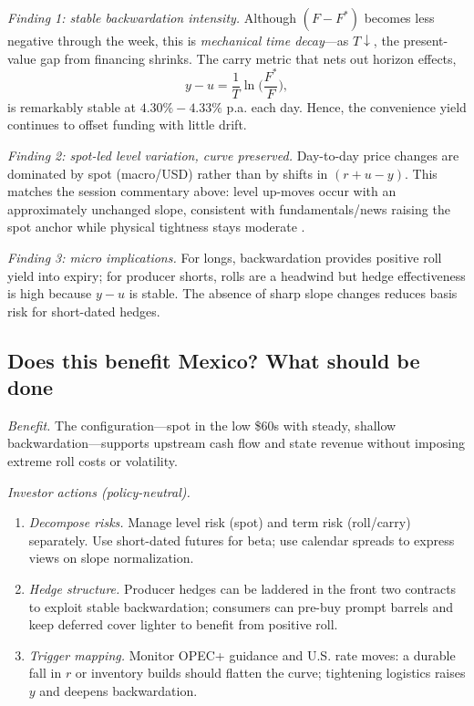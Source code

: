 \documentclass[11pt,a4paper]{article} %
\begin{document}
\textit{Finding 1: stable backwardation intensity.} Although \((F-F^{*})\) becomes less negative through the week, this is \emph{mechanical time decay}—as \(T\downarrow\), the present-value gap from financing shrinks. The carry metric that nets out horizon effects,
\[
y-u=\frac{1}{T}\ln\!\Big(\frac{F^{*}}{F}\Big),
\]
is remarkably stable at \({4.30\%{-}4.33\%}\) p.a. each day. Hence, the convenience yield continues to offset funding with little drift.

\textit{Finding 2: spot-led level variation, curve preserved.} Day-to-day price changes are dominated by spot (macro/USD) rather than by shifts in \((r+u-y)\). This matches the session commentary above: level up-moves occur with an approximately unchanged slope, consistent with fundamentals/news raising the spot anchor while physical tightness stays moderate \citep{eia_prices_2023,eia_opec_2024,bis_usd_commodity_2023}.

\textit{Finding 3: micro implications.} For longs, backwardation provides positive roll yield into expiry; for producer shorts, rolls are a headwind but hedge effectiveness is high because \(y-u\) is stable. The absence of sharp slope changes reduces basis risk for short-dated hedges.

\subsection{Does this benefit Mexico? What should be done}
\textit{Benefit.} The configuration—spot in the low \$60s with steady, shallow backwardation—supports upstream cash flow and state revenue without imposing extreme roll costs or volatility.

\textit{Investor actions (policy-neutral).}
\begin{enumerate}
  \item \emph{Decompose risks.} Manage level risk (spot) and term risk (roll/carry) separately. Use short-dated futures for beta; use calendar spreads to express views on slope normalization.
  \item \emph{Hedge structure.} Producer hedges can be laddered in the front two contracts to exploit stable backwardation; consumers can pre-buy prompt barrels and keep deferred cover lighter to benefit from positive roll.
  \item \emph{Trigger mapping.} Monitor OPEC+ guidance and U.S. rate moves: a durable fall in \(r\) or inventory builds should flatten the curve; tightening logistics raises \(y\) and deepens backwardation.
\end{enumerate}
\end{document}
